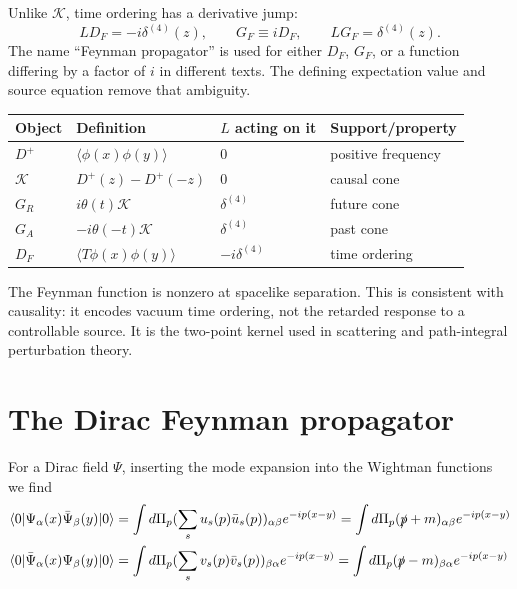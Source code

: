 \documentclass[11pt]{article}
\newcommand{\vac}{\lvert0\rangle}
\newcommand{\vbra}{\langle0\rvert}
\begin{document}
Unlike \(\mathcal K\), time ordering has a derivative jump:
\begin{equation}
 LD_F=-i\delta^{(4)}(z),\qquad
 G_F\equiv iD_F,\qquad LG_F=\delta^{(4)}(z).
 \label{k-eq:DFsource}
\end{equation}
The name ``Feynman propagator'' is used for either \(D_F\), \(G_F\), or a
function differing by a factor of \(i\) in different texts. The defining
expectation value and source equation remove that ambiguity.
\begin{center}\small
\begin{tabular}{llll}
\toprule
Object & Definition & \(L\) acting on it & Support/property\\
\midrule
\(D^+\) & \(\langle\phi(x)\phi(y)\rangle\) & \(0\) & positive frequency\\
\(\mathcal K\) & \(D^+(z)-D^+(-z)\) & \(0\) & causal cone\\
\(G_R\) & \(i\theta(t)\mathcal K\) & \(\delta^{(4)}\) & future cone\\
\(G_A\) & \(-i\theta(-t)\mathcal K\) & \(\delta^{(4)}\) & past cone\\
\(D_F\) & \(\langle T\phi(x)\phi(y)\rangle\) & \(-i\delta^{(4)}\) & time ordering\\
\bottomrule
\end{tabular}
\end{center}
The Feynman function is nonzero at spacelike separation. This is
consistent with causality: it encodes vacuum time ordering, not the
retarded response to a controllable source. It is the two-point kernel
used in scattering and path-integral perturbation theory.

\section{The Dirac Feynman propagator}

For a Dirac field $\Psi$, inserting the mode expansion into the Wightman functions we find
\begin{align}
&	\vbra\Psi_\alpha(x)\bar{\Psi}_\beta(y)\vac=\int d\Pi_p (\sum_s u_s(p)\bar{u}_s(p))_{\alpha\beta}e^{-i p(x-y)}=\int d\Pi_p(\slashed p+m)_{\alpha\beta} e^{-i p(x-y)}\nonumber\\
	&	\vbra\bar{\Psi}_\alpha(x)\Psi_\beta(y)\vac=\int d\Pi_p (\sum_s v_s(p)\bar{v}_s(p))_{\beta\alpha}e^{-i p(x-y)}=\int d\Pi_p(\slashed p-m)_{\beta\alpha} e^{-i p(x-y)}
\end{align}
\end{document}
